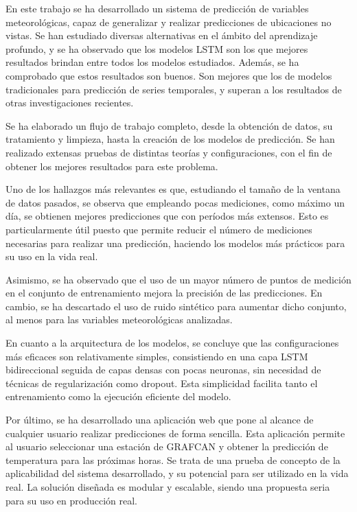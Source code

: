 
En este trabajo se ha desarrollado un sistema de predicción de variables meteorológicas, capaz de generalizar y realizar predicciones de ubicaciones no vistas. 
Se han estudiado diversas alternativas en el ámbito del aprendizaje profundo, y se ha observado que los modelos LSTM son los que mejores resultados brindan entre todos los modelos estudiados. Además,
se ha comprobado que estos resultados son buenos. Son mejores que los de modelos tradicionales para predicción de series temporales, y superan a los resultados de otras investigaciones 
recientes.

Se ha elaborado un flujo de trabajo completo, desde la obtención de datos, su tratamiento y limpieza, hasta la creación de los modelos de predicción. Se han 
realizado extensas pruebas de distintas teorías y configuraciones, con el fin de obtener los mejores resultados para este problema.

Uno de los hallazgos más relevantes es que, estudiando el tamaño de la ventana de datos pasados, se observa que empleando pocas mediciones, como máximo un día, se obtienen mejores predicciones que
con períodos más extensos. Esto es particularmente útil puesto que permite reducir el número de mediciones necesarias para realizar una predicción, haciendo los modelos 
más prácticos para su uso en la vida real.

Asimismo, se ha observado que el uso de un mayor número de puntos de medición en el conjunto de entrenamiento mejora la precisión de las predicciones.
En cambio, se ha descartado el uso de ruido sintético para aumentar dicho conjunto, al menos para las variables meteorológicas analizadas.

En cuanto a la arquitectura de los modelos, se concluye que las configuraciones más eficaces son relativamente simples, consistiendo en una capa LSTM bidireccional seguida de capas densas con pocas neuronas, sin necesidad de técnicas de regularización como dropout. 
Esta simplicidad facilita tanto el entrenamiento como la ejecución eficiente del modelo.

Por último, se ha desarrollado una aplicación web que pone al alcance de cualquier usuario realizar predicciones de forma sencilla. 
Esta aplicación permite al usuario seleccionar una estación de GRAFCAN y obtener la predicción de temperatura para las próximas horas.
Se trata de una prueba de concepto de la aplicabilidad del sistema desarrollado, y su potencial para ser utilizado en la vida real. La solución diseñada
es modular y escalable, siendo una propuesta seria para su uso en producción real.

